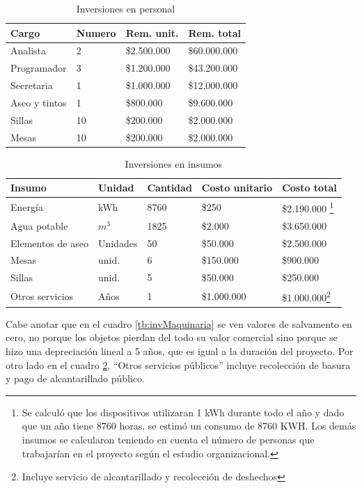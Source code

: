 \documentclass[a4paper, 12pt, oneside]{article}
\begin{document}
	\begin{table}
		\caption{Inversiones en personal}
		\begin{tabular}{ | p{3cm} | p{2cm} | p{2cm} | p{2cm} | }
		\hline
		Cargo & Numero & Rem. unit. & Rem. total \\
		\hline
		Analista & 2 & \$2.500.000 & \$60.000.000 \\
		\hline					
		Programador & 3 & \$1.200.000 & \$43.200.000 \\
		\hline
		Secretaria & 1 & \$1.000.000 & \$12.000.000 \\
		\hline
		Aseo y tintos & 1 & \$800.000 & \$9.600.000 \\
		\hline
		Sillas & 10 & \$200.000 & \$2.000.000 \\
		\hline
		Mesas & 10 & \$200.000 & \$2.000.000  \\
		\hline
		\end{tabular}
		\label{tb:invPersonal}
	\end{table}

	\begin{table}
		\caption{Inversiones en insumos}
		\begin{tabular}{ | p{2.5cm} | p{1.5cm} | p{1.5cm} | p{2cm} | p{2cm} | }
		\hline
		Insumo & Unidad & Cantidad & Costo unitario & Costo total \\
		\hline					
		Energía & kWh & 8760 & \$250 & \$2.190.000 \footnote{Se calculó que los dispositivos utilizaran 1 kWh durante todo el año y dado que un año tiene 8760 horas, se estimó un consumo de 8760 KWH. Los demás insumos se calcularon teniendo en cuenta el número de personas que trabajarían en el proyecto según el estudio organizacional.}\\
		\hline					
		Agua potable & $m^{3}$ & 1825 & \$2.000 & \$3.650.000 \\
		\hline
		Elementos de aseo & Unidades & 50 & \$50.000 & \$2.500.000 \\
		\hline
		Mesas & unid. & 6 & \$150.000 & \$900.000 \\
		\hline
		Sillas & unid. & 5 & \$50.000 & \$250.000 \\
		\hline
		Otros servicios & Años & 1 & \$1.000.000 & \$1.000.000\footnote{Incluye servicio de alcantarillado y recolección de deshechos} \\
		\hline
		\end{tabular}
		\label{tb:invInsumos}
	\end{table}
	
	Cabe anotar que en el cuadro \ref{tb:invMaquinaria} se ven valores de salvamento en cero, no porque los objetos pierdan del todo su valor comercial sino porque se hizo una depreciación lineal a 5 años, que es igual a la duración del proyecto. Por otro lado en el cuadro \ref{tb:invInsumos}, ``Otros servicios públicos'' incluye recolección de basura y pago de alcantarillado público.
		
\end{document}
